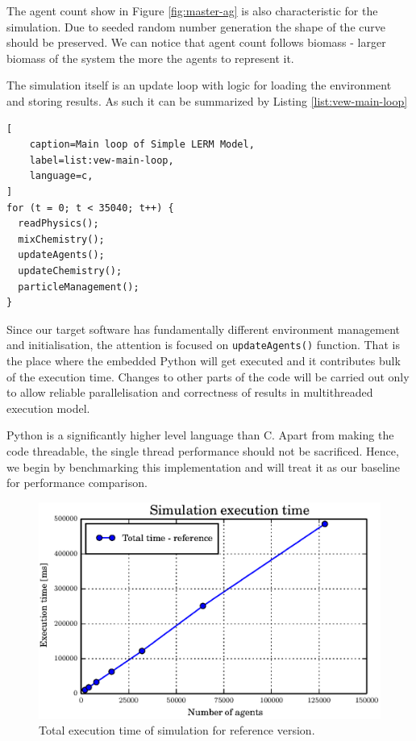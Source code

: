 \documentclass[12pt, a4paper]{report}
\begin{document}
The agent count show in Figure \ref{fig:master-ag} is also characteristic
for the simulation. Due to seeded random number generation the shape of
the curve should be preserved. We can notice that agent count follows biomass
- larger biomass of the system the more the agents to  represent it.

The simulation itself is an update loop with logic for loading the
environment and storing results. As such it can be summarized by
Listing \ref{list:vew-main-loop}

\begin{lstlisting}[
    caption=Main loop of Simple LERM Model,
    label=list:vew-main-loop,
    language=c,
]
for (t = 0; t < 35040; t++) {
  readPhysics();
  mixChemistry();
  updateAgents();
  updateChemistry();
  particleManagement();
}
\end{lstlisting}

Since our target software has fundamentally different environment management
and initialisation, the attention is focused on \lstinline{updateAgents()}
function. That is the place where the embedded Python will get executed
and it contributes bulk of the execution time. Changes to other parts
of the code will be carried out only to allow reliable parallelisation
and correctness of results in multithreaded execution model.

Python is a significantly higher level language than C. Apart from making
the code threadable, the single thread performance should not be sacrificed.
Hence, we begin by benchmarking this implementation and will treat it as
our baseline for performance comparison.

\begin{figure}[H]
  \begin{center}
    \includegraphics[width=\columnwidth]{graphs/master-perf.eps}
    \caption{Total execution time of simulation for reference version.}
    \label{fig:master-perf}
  \end{center}
\end{figure}
\end{document}
